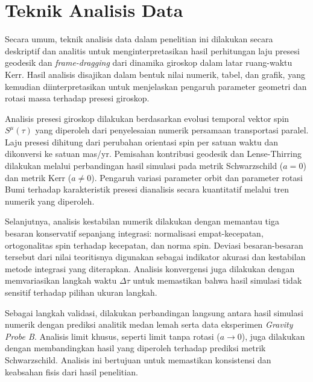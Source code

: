 \section{Teknik Analisis Data}
\label{sec:teknik-analisis}

Secara umum, teknik analisis data dalam penelitian ini dilakukan secara deskriptif dan analitis untuk menginterpretasikan hasil perhitungan laju presesi geodesik dan \textit{frame-dragging} dari dinamika giroskop dalam latar ruang-waktu Kerr. Hasil analisis disajikan dalam bentuk nilai numerik, tabel, dan grafik, yang kemudian diinterpretasikan untuk menjelaskan pengaruh parameter geometri dan rotasi massa terhadap presesi giroskop.

Analisis presesi giroskop dilakukan berdasarkan evolusi temporal vektor spin $S^\mu(\tau)$ yang diperoleh dari penyelesaian numerik persamaan transportasi paralel. Laju presesi dihitung dari perubahan orientasi spin per satuan waktu dan dikonversi ke satuan mas/yr. Pemisahan kontribusi geodesik dan Lense-Thirring dilakukan melalui perbandingan hasil simulasi pada metrik Schwarzschild ($a = 0$) dan metrik Kerr ($a \neq 0$). Pengaruh variasi parameter orbit dan parameter rotasi Bumi terhadap karakteristik presesi dianalisis secara kuantitatif melalui tren numerik yang diperoleh.

Selanjutnya, analisis kestabilan numerik dilakukan dengan memantau tiga besaran konservatif sepanjang integrasi: normalisasi empat-kecepatan, ortogonalitas spin terhadap kecepatan, dan norma spin. Deviasi besaran-besaran tersebut dari nilai teoritisnya digunakan sebagai indikator akurasi dan kestabilan metode integrasi yang diterapkan. Analisis konvergensi juga dilakukan dengan memvariasikan langkah waktu $\Delta\tau$ untuk memastikan bahwa hasil simulasi tidak sensitif terhadap pilihan ukuran langkah.

Sebagai langkah validasi, dilakukan perbandingan langsung antara hasil simulasi numerik dengan prediksi analitik medan lemah serta data eksperimen \textit{Gravity Probe B}. Analisis limit khusus, seperti limit tanpa rotasi ($a \to 0$), juga dilakukan dengan membandingkan hasil yang diperoleh terhadap prediksi metrik Schwarzschild. Analisis ini bertujuan untuk memastikan konsistensi dan keabsahan fisis dari hasil penelitian.
